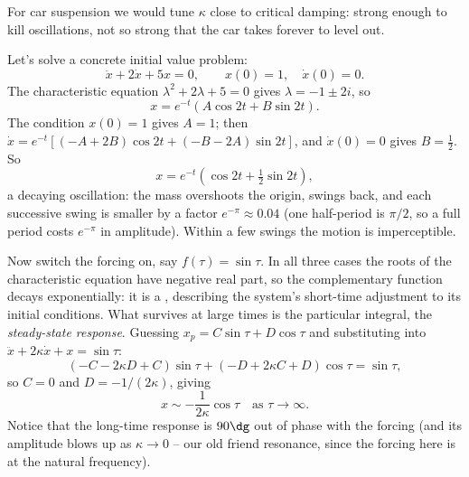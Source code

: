 \begin{center}
\end{center}
For car suspension we would tune $\kappa$ close to critical damping: strong enough to kill oscillations, not so strong that the car takes forever to level out.

\begin{example}
	Let's solve a concrete initial value problem:
	$$
	\ddot x + 2\dot x + 5x = 0, \qquad x(0) = 1, \quad \dot x(0) = 0.
	$$
	The characteristic equation $\lambda^2 + 2\lambda + 5 = 0$ gives $\lambda = -1 \pm 2i$, so
	$$
	x = e^{-t}(A\cos 2t + B \sin 2t).
	$$
	The condition $x(0) = 1$ gives $A = 1$; then $\dot x = e^{-t}\left[(-A + 2B)\cos 2t + (-B - 2A)\sin 2t\right]$, and $\dot x(0) = 0$ gives $B = \frac12$. So
	$$
	x = e^{-t}\left(\cos 2t + \tfrac12 \sin 2t\right),
	$$
	a decaying oscillation: the mass overshoots the origin, swings back, and each successive swing is smaller by a factor $e^{-\pi} \approx 0.04$ (one half-period is $\pi/2$, so a full period costs $e^{-\pi}$ in amplitude). Within a few swings the motion is imperceptible.
\end{example}

Now switch the forcing on, say $f(\tau) = \sin \tau$. In all three cases the roots of the characteristic equation have negative real part, so the complementary function decays exponentially: it is a , describing the system's short-time adjustment to its initial conditions. What survives at large times is the particular integral, the \emph{steady-state response}. Guessing $x_p = C \sin \tau + D \cos \tau$ and substituting into $\ddot x + 2\kappa \dot x + x = \sin \tau$:
$$
(-C - 2\kappa D + C) \sin \tau + (-D + 2\kappa C + D) \cos \tau = \sin \tau,
$$
so $C = 0$ and $D = -1/(2\kappa)$, giving
$$
x \sim -\frac{1}{2\kappa} \cos \tau \quad \text{as } \tau \to \infty.
$$
Notice that the long-time response is $90\dg$ out of phase with the forcing (and its amplitude blows up as $\kappa \to 0$ -- our old friend resonance, since the forcing here is at the natural frequency).

